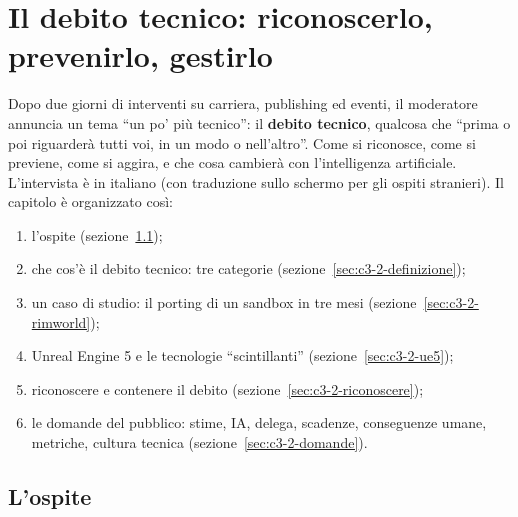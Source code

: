 
\chapter[Il debito tecnico]{Il debito tecnico: riconoscerlo, prevenirlo,
gestirlo}
\label{cap:c3-2-debito-tecnico}

Dopo due giorni di interventi su carriera, publishing ed eventi, il moderatore
annuncia un tema ``un po' più tecnico'': il \textbf{debito tecnico}, qualcosa che
``prima o poi riguarderà tutti voi, in un modo o nell'altro''. Come si riconosce,
come si previene, come si aggira, e che cosa cambierà con l'intelligenza
artificiale. L'intervista è in italiano (con traduzione sullo schermo per gli
ospiti stranieri). Il capitolo è organizzato così:
\begin{enumerate}
  \item l'ospite (sezione~\ref{sec:c3-2-ospite});
  \item che cos'è il debito tecnico: tre categorie
        (sezione~\ref{sec:c3-2-definizione});
  \item un caso di studio: il porting di un sandbox in tre mesi
        (sezione~\ref{sec:c3-2-rimworld});
  \item Unreal Engine 5 e le tecnologie ``scintillanti''
        (sezione~\ref{sec:c3-2-ue5});
  \item riconoscere e contenere il debito (sezione~\ref{sec:c3-2-riconoscere});
  \item le domande del pubblico: stime, IA, delega, scadenze, conseguenze umane,
        metriche, cultura tecnica (sezione~\ref{sec:c3-2-domande}).
\end{enumerate}

\section{L'ospite}
\label{sec:c3-2-ospite}

